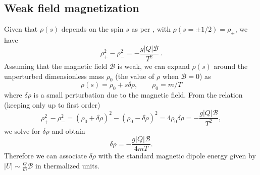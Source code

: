 


\subsection{Weak field magnetization}
Given that \(\rho(s)\) depends on the spin \(s\) as per , with \(\rho(s=\pm1/2) = \rho_{\pm}\), we have
\begin{equation}
\rho_{+}^{2} - \rho_{-}^{2} = -\frac{g |Q| \mathcal{B}}{T^{2}}\,.
\end{equation}
Assuming that the magnetic field \(\mathcal{B}\) is weak, we can expand \(\rho(s)\) around the unperturbed dimensionless mass \(\rho_0\) (the value of \(\rho\) when \(\mathcal{B} = 0\)) as
\begin{equation}
\rho(s) = \rho_0 + s \delta\rho,\qquad \rho_{0} = m/T
\end{equation}
where \( \delta\rho \) is a small perturbation due to the magnetic field. From the relation (keeping only up to first order)
\begin{equation}
\rho_{+}^{2} - \rho_{-}^{2} = ( \rho_0 + \delta\rho )^2 - ( \rho_0 - \delta\rho )^2 = 4 \rho_0 \delta\rho = -\frac{g |Q| \mathcal{B}}{T^{2}},
\end{equation}
we solve for \(\delta\rho\) and obtain
\begin{equation}
\label{eq:weak_field_perturbation}
\delta\rho = -\frac{g |Q| \mathcal{B}}{4 m T}.
\end{equation}
Therefore we can associate \(\delta\rho\) with the standard magnetic dipole energy given by \(|U|\sim\frac{Q}{m}\mathcal{B}\) in thermalized units.

